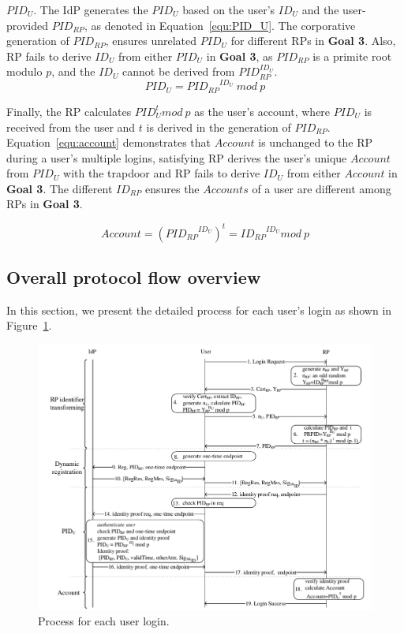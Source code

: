 \noindent\textbf{$PID_U$}. The IdP generates the $PID_U$ based on the user's $ID_U$ and the user-provided $PID_{RP}$, as denoted in Equation~\ref{equ:PID_U}.
The corporative generation of $PID_{RP}$, ensures unrelated $PID_U$  for different RPs in \textbf{Goal 3}. Also, RP fails to derive $ID_U$ from either $PID_U$ in \textbf{Goal 3}, as
   $PID_{RP}$ is a primite root modulo $p$, and the $ID_U$ cannot be derived from $PID_{RP}^{ID_U}$.
\begin{equation}
 PID_U = {PID_{RP}}^{ID_U} \ mod \ p
 \label{equ:PID_U}
\end{equation}

Finally, the RP calculates $PID_U^t mod \ p$ as the  user's account, where $PID_U$ is received from the user and $t$ is derived in the generation of $PID_{RP}$. Equation~\ref{equ:account} demonstrates that $Account$ is unchanged to the RP during a user's multiple logins, satisfying RP derives the user's unique $Account$  from $PID_U$ with the  trapdoor and  RP fails to derive $ID_U$ from either $Account$ in \textbf{Goal 3}. The different $ID_{RP}$ ensures the $Accounts$ of a user are different among RPs in \textbf{Goal 3}.

 \begin{equation}
   Account = ({PID_{RP}}^{ID_U})^t = {ID_{RP}}^{ID_U} mod \ p
   \label{equ:account}
   \end{equation}


\subsection{Overall protocol flow overview}
\label{sebsec:loginprocess}
In this section, we present the detailed process for each user's login as shown in Figure~\ref{fig:process}. %

\begin{figure}
  \centering
  \includegraphics[width=0.85\linewidth]{fig/process.pdf}
  \caption{Process for each user login.}
  \label{fig:process}
\end{figure}

